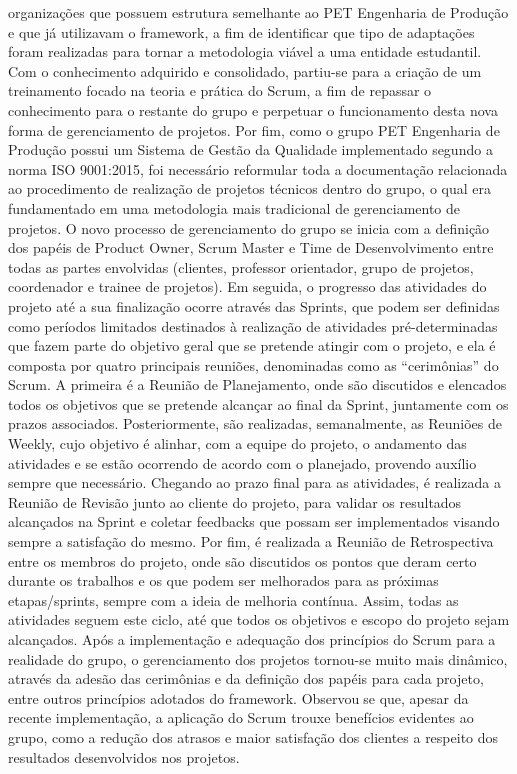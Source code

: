 organizações que possuem estrutura semelhante ao PET Engenharia de Produção e que já 
utilizavam o framework, a fim de identificar que tipo de adaptações foram realizadas para tornar a 
metodologia viável a uma entidade estudantil.
Com o conhecimento adquirido e consolidado, partiu-se para a criação de um treinamento 
focado na teoria e prática do Scrum, a fim de repassar o conhecimento para o restante do grupo e 
perpetuar o funcionamento desta nova forma de gerenciamento de projetos. Por fim, como o grupo 
PET Engenharia de Produção possui um Sistema de Gestão da Qualidade implementado segundo 
a norma ISO 9001:2015, foi necessário reformular toda a documentação relacionada ao 
procedimento de realização de projetos técnicos dentro do grupo, o qual era fundamentado em 
uma metodologia mais tradicional de gerenciamento de projetos.
O novo processo de gerenciamento do grupo se inicia com a definição dos papéis de
Product Owner, Scrum Master e Time de Desenvolvimento entre todas as partes envolvidas 
(clientes, professor orientador, grupo de projetos, coordenador e trainee de projetos). Em seguida, 
o progresso das atividades do projeto até a sua finalização ocorre através das Sprints, que podem 
ser definidas como períodos limitados destinados à realização de atividades pré-determinadas que 
fazem parte do objetivo geral que se pretende atingir com o projeto, e ela é composta por quatro 
principais reuniões, denominadas como as “cerimônias” do Scrum.
A primeira é a Reunião de Planejamento, onde são discutidos e elencados todos os 
objetivos que se pretende alcançar ao final da Sprint, juntamente com os prazos associados. 
Posteriormente, são realizadas, semanalmente, as Reuniões de Weekly, cujo objetivo é alinhar, 
com a equipe do projeto, o andamento das atividades e se estão ocorrendo de acordo com o 
planejado, provendo auxílio sempre que necessário. Chegando ao prazo final para as atividades, é 
realizada a Reunião de Revisão junto ao cliente do projeto, para validar os resultados alcançados 
na Sprint e coletar feedbacks que possam ser implementados visando sempre a satisfação do 
mesmo. Por fim, é realizada a Reunião de Retrospectiva entre os membros do projeto, onde são 
discutidos os pontos que deram certo durante os trabalhos e os que podem ser melhorados para as 
próximas etapas/sprints, sempre com a ideia de melhoria contínua. Assim, todas as atividades 
seguem este ciclo, até que todos os objetivos e escopo do projeto sejam alcançados.
Após a implementação e adequação dos princípios do Scrum para a realidade do grupo, o 
gerenciamento dos projetos tornou-se muito mais dinâmico, através da adesão das cerimônias e da 
definição dos papéis para cada projeto, entre outros princípios adotados do framework. Observouse que, apesar da recente implementação, a aplicação do Scrum trouxe benefícios evidentes ao 
grupo, como a redução dos atrasos e maior satisfação dos clientes a respeito dos resultados 
desenvolvidos nos projetos.

